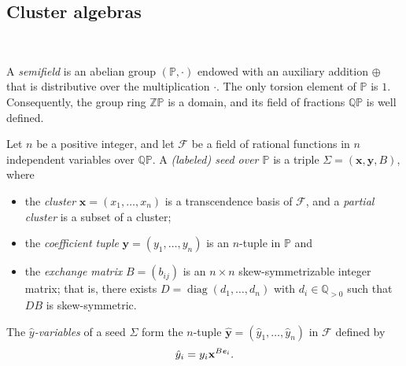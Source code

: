 \documentclass[11pt,reqno]{amsart}
\theoremstyle{plain}
\theoremstyle{definition}
\numberwithin{equation}{section}
\newcommand\hua{\mathcal}
\newcommand\ZZ{\mathbb{Z}}
\newcommand\QQ{\mathbb{Q}}
\newcommand\<{\langle}
\renewcommand\>{\rangle}
\newcommand{\on}[1]{\operatorname{#1}}
\newcommand{\bfit}[1]{\textbf{\textit{#1}}}
\def\PP{\mathbb{P}}
\def\Trop{\on{Trop}} %
\def\uple{\mathbf{u}}
\def\seed{\Sigma}
\def\xx{\mathbf{x}}%
\def\yy{\mathbf{y}}%
\begin{document}
\subsection{Cluster algebras}\label{sec:CA}\


A \emph{semifield} is an abelian group $(\PP,\cdot)$ endowed with an auxiliary addition $\oplus$ that is distributive over the multiplication $\cdot$.
The only torsion element of $\PP$ is $1$. Consequently, the group ring $\ZZ\PP$ is a domain, and its field of fractions $\QQ\PP$ is well defined.



Let $n$ be a positive integer, and let $\hua{F}$ be a field of rational functions in $n$ independent variables over $\QQ\PP$.
A \emph{(labeled) seed over $\PP$} is a triple $\seed=(\xx,\yy,B)$, where
\begin{itemize}
    \item the \emph{cluster} $\xx=(x_1,\ldots,x_n)$ is a transcendence basis of $\hua{F}$, and a \emph{partial cluster} is a subset of a cluster;
    \item the \emph{coefficient tuple} $\yy=(y_1,\ldots,y_n)$ is an $n$-tuple in $\PP$ and
    \item the \emph{exchange matrix} $B=(b_{ij})$ is an $n\times n$ skew-symmetrizable integer matrix; that is, there exists $D=\on{diag}(d_1,\ldots,d_n)$ with $d_i\in\QQ_{>0}$ such that $DB$ is skew-symmetric.
\end{itemize}
The \emph{$\hat{y}$-variables} of a seed $\seed$ form the $n$-tuple $\hat{\yy}=(\hat{y}_1,\ldots,\hat{y}_n)$ in $\hua{F}$ defined by
\begin{gather}\label{eq:haty}
    \hat{y}_i=y_i\xx^{B\bfit{e}_i}.
\end{gather}
\end{document}
